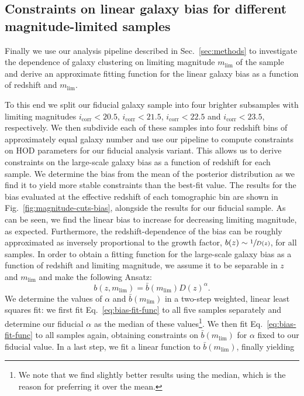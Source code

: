 \documentclass[a4paper,11pt]{article}
\begin{document}
\subsection{Constraints on linear galaxy bias for different magnitude-limited samples}\label{ssec:results.mag_cuts}

Finally we use our analysis pipeline described in Sec.~\ref{sec:methods} to investigate the dependence of galaxy clustering on limiting magnitude $m_{\mathrm{lim}}$ of the sample and derive an approximate fitting function for the linear galaxy bias as a function of redshift and $m_{\mathrm{lim}}$. 

To this end we split our fiducial galaxy sample into four brighter subsamples with limiting magnitudes $i_{\mathrm{corr}} < 20.5$, $i_{\mathrm{corr}} < 21.5$, $i_{\mathrm{corr}} < 22.5$ and $i_{\mathrm{corr}} < 23.5$, respectively. We then subdivide each of these samples into four redshift bins of approximately equal galaxy number and use our pipeline to compute constraints on HOD parameters for our fiducial analysis variant. This allows us to derive constraints on the large-scale galaxy bias as a function of redshift for each sample. We determine the bias from the mean of the posterior distribution as we find it to yield more stable constraints than the best-fit value. The results for the bias evaluated at the effective redshift of each tomographic bin are shown in Fig.~\ref{fig:magnitude-cuts-bias}, alongside the results for our fiducial sample. As can be seen, we find the linear bias to increase for decreasing limiting magnitude, as expected. Furthermore, the redshift-dependence of the bias can be roughly approximated as inversely proportional to the growth factor, $b(z) \sim \sfrac{1}{D(z)}$, for all samples. In order to obtain a fitting function for the large-scale galaxy bias as a function of redshift and limiting magnitude, we assume it to be separable in $z$ and $m_{\mathrm{lim}}$ and make the following Ansatz:
\begin{equation}
b(z, m_{\mathrm{lim}}) = \bar{b}(m_{\mathrm{lim}}) D(z)^{\alpha}.
\label{eq:bias-fit-func}
\end{equation}  
We determine the values of $\alpha$ and $\bar{b}(m_{\mathrm{lim}})$ in a two-step weighted, linear least squares fit: we first fit Eq.~\ref{eq:bias-fit-func} to all five samples separately and determine our fiducial $\alpha$ as the median of these values\footnote{We note that we find slightly better results using the median, which is the reason for preferring it over the mean.}. We then fit Eq.~\ref{eq:bias-fit-func} to all samples again, obtaining constraints on $\bar{b}(m_{\mathrm{lim}})$ for $\alpha$ fixed to our fiducial value. In a last step, we fit a linear function to $\bar{b}(m_{\mathrm{lim}})$, finally yielding
\end{document}
